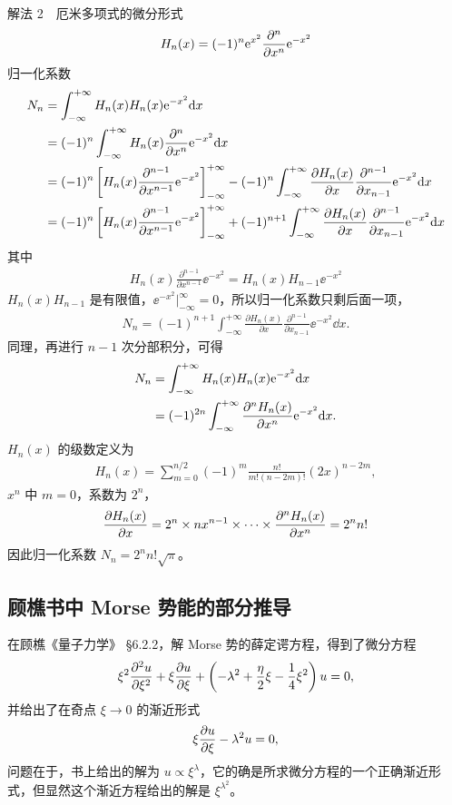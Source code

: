 解法 2　厄米多项式的微分形式
\begin{align}
    H_{n} (x)= (-1)^{n} \mathrm{e}^{x^2} \pdv[n]{x} \mathrm{e}^{-x^2}
\end{align}
归一化系数
\begin{align}
        N_n&=\int_{-\infty}^{+\infty} H_n(x) H_n(x) \mathrm{e}^{-x^2} \mathrm{d} x\\
        &=(-1)^n \int_{-\infty}^{+\infty} H_n(x) \frac{\partial^n}{\partial x^n} \mathrm{e}^{-x^2} \mathrm{d} x\\
        &=(-1)^n\left[H_n(x) \frac{\partial^{n-1}}{\partial x^{n-1}} \mathrm{e}^{-x^2}\right]_{-\infty}^{+\infty}-(-1)^n \int_{-\infty}^{+\infty} \frac{\partial H_n(x)}{\partial x} \frac{\partial^{n-1}}{\partial x_{n-1}} \mathrm{e}^{-x^2} \mathrm{d} x \notag \\
        &=(-1)^n\left[H_n(x) \frac{\partial^{n-1}}{\partial x^{n-1}} \mathrm{e}^{-x^2}\right]_{-\infty}^{+\infty}+
        (-1)^{n+1} \int_{-\infty}^{+\infty} \frac{\partial H_n(x)}{\partial x} \frac{\partial^{n-1}}{\partial x_{n-1}} \mathrm{e}^{-x^2} \mathrm{d} x
\end{align}
其中
\begin{align}
    H_n(x) \frac{\partial^{n-1}}{\partial x^{n-1}} \ee^{-x^2} = H_n(x) H_{n-1} \ee^{-x^2}
\end{align}
$H_n(x) H_{n-1}$ 是有限值，$\ee^{-x^2}|_{-\infty}^{\infty} = 0$，所以归一化系数只剩后面一项，
\begin{align}
    N_n = (-1)^{n+1} \int_{-\infty}^{+\infty} \frac{\partial H_n(x)}{\partial x} \frac{\partial^{n-1}}{\partial x_{n-1}} \ee^{-x^2} \dd x. 
\end{align}
同理，再进行 $n-1$ 次分部积分，可得
\begin{align}
    N_n &= \int_{- \infty}^{+ \infty} H_n(x) H_n(x) \mathrm{e}^{-x^2} \mathrm{d} x \\
    & = (-1)^{2n} \int_{- \infty}^{+ \infty} \pdv[n]{H_n(x)}{x} \mathrm{e}^{-x^2} \mathrm{d} x.
\end{align}
$H_n(x)$ 的级数定义为
\begin{align}
    H_n(x) = \sum_{m=0}^{n/2} (-1)^m \frac{n!}{m!(n-2m)!} (2x)^{n-2m},
\end{align}
$x^n$ 中 $m=0$，系数为 $2^n$，
\begin{align}
    \pdv{H_n(x)}{x} = 2^n\times n x^{n-1} \times \cdots \times \pdv[n]{H_n(x)}{x} = 2^n n!
\end{align}
因此归一化系数 $N_n = 2^n n! \sqrt\pi$。

\subsection{顾樵书中 Morse 势能的部分推导}
在顾樵《量子力学》 \S 6.2.2，解 Morse 势的薛定谔方程，得到了微分方程
\begin{align}
    \xi^2 \pdv[2]{u}{\xi} + \xi \pdv{u}{\xi} + \left( - \lambda^2 + \frac{\eta}2\xi - \frac14\xi^2\right)u = 0,
\end{align}
并给出了在奇点 $\xi \rightarrow 0$ 的渐近形式
\begin{align}
    \xi\pdv{u}{\xi} - \lambda^2 u = 0,
\end{align}
问题在于，书上给出的解为 $u \propto \xi^\lambda$，它的确是所求微分方程的一个正确渐近形式，但显然这个渐近方程给出的解是 $\xi^{\lambda^2}$。

